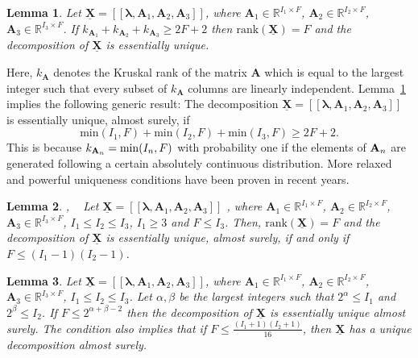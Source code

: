 \documentclass[journal]{IEEEtran}
\newtheorem{Lemma}{Lemma}
\begin{document}
\begin{Lemma}\label{lem:kruskal}
\cite{Kru1977} Let $\underline{\mathbf{X}} = [\![{\bm \lambda}, \mathbf{A}_1,\mathbf{A}_2,\mathbf{A}_3 ]\!]$, where $\mathbf{A}_1 \in \mathbb{R}^{I_1 \times F}$, $\mathbf{A}_2 \in \mathbb{R}^{I_2 \times F}$, $\mathbf{A}_3 \in \mathbb{R}^{I_3 \times F}$. If $k_{\mathbf{A}_1} + k_{\mathbf{A}_2} + k_{\mathbf{A}_3} \geq 2F + 2$ then $\textrm{rank}(\underline{\mathbf{X}}) = F $ and the decomposition of $\underline{\mathbf{X}}$ is essentially unique. 
\end{Lemma}
Here, $k_{\mathbf{A}}$ denotes the Kruskal rank of the matrix $\mathbf{A}$ which is equal to the largest integer such that every subset of $k_{\mathbf{A}}$ columns are linearly independent. Lemma~\ref{lem:kruskal} implies the following generic result: 
The decomposition $\underline{\mathbf{X}} = [\![{\bm \lambda}, \mathbf{A}_1,\mathbf{A}_2,\mathbf{A}_3 ]\!]$ is essentially unique, almost surely, if
\begin{equation}\label{lem:thm1}
\textrm{min}(I_1,F) + \textrm{min}(I_2,F) + \textrm{min}(I_3,F) \geq 2F + 2.
\end{equation}
This is because ${k}_{{\bf A}_n}=\min(I_n,F)$ with probability one if the elements of ${\bf A}_n$ are generated following a certain absolutely continuous distribution. More relaxed and powerful uniqueness conditions have been proven in recent years.

\begin{Lemma}\label{lem:generic_1}\cite{ChiOtta2012}, ~\cite{DoDe2015} { Let $\underline{\mathbf{X}} = [\![\boldsymbol{\lambda} ,\mathbf{A}_1,\mathbf{A}_2,\mathbf{A}_3 ]\!]$ }, where $\mathbf{A}_1 \in \mathbb{R}^{I_1 \times F}$, $\mathbf{A}_2 \in \mathbb{R}^{I_2 \times F}$, $\mathbf{A}_3 \in \mathbb{R}^{I_3 \times F}$, $ I_1 \leq I_2 \leq I_3$, {$ I_1 \geq 3$} and $F \leq I_3$. Then, $\textrm{rank}(\underline{\mathbf{X}}) = F $ and the decomposition of $\underline{\mathbf{X}}$ is essentially unique, almost surely, if and only if $ F \leq (I_1 -1)(I_2 -1)$.
\end{Lemma}

\begin{Lemma}\label{lem:generic_2}
\cite{ChiOtta2012} Let $\underline{\mathbf{X}} = [\![{\bm \lambda}, \mathbf{A}_1,\mathbf{A}_2,\mathbf{A}_3 ]\!]$, where $\mathbf{A}_1 \in \mathbb{R}^{I_1 \times F}$, $\mathbf{A}_2 \in \mathbb{R}^{I_2 \times F}$, $\mathbf{A}_3 \in \mathbb{R}^{I_3 \times F}$, $ I_1 \leq I_2 \leq I_3$. Let $\alpha,\beta$ be the largest integers such that $2^\alpha \leq I_1$ and $2^\beta \leq I_2$. If $F \leq 2^{\alpha + \beta -2}$ then the decomposition of $\underline{\mathbf{X}}$ is essentially unique almost surely. The condition also implies that if $F\leq \frac{(I_1+1)(I_2+1)}{16}$, then $\underline{\mathbf{X}}$ has a unique decomposition almost surely.
\end{Lemma}
\end{document}
